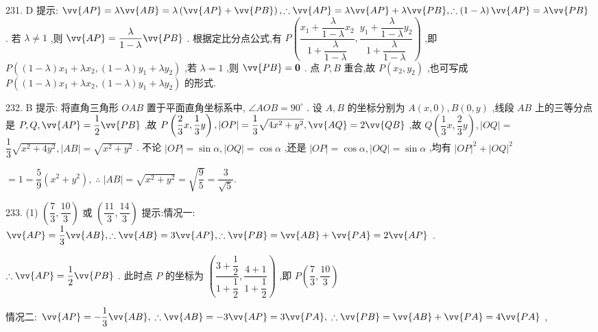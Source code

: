 231. D 提示: $\vv{AP} = \lambda \vv{AB} = \lambda \left( {\vv{AP} + \vv{PB}}\right) ,\therefore \vv{AP} = \lambda \vv{AP} + \lambda \vv{PB},\therefore \left( {1 - \lambda }\right) \vv{AP} = \lambda \vv{PB}$ . 若 $\lambda  \neq  1$ ,则 $\vv{AP} = \dfrac{\lambda }{1 - \lambda }\vv{PB}$ . 根据定比分点公式,有 $P\left( {\dfrac{{x}_{1} + \dfrac{\lambda }{1 - \lambda }{x}_{2}}{1 + \dfrac{\lambda }{1 - \lambda }},\dfrac{{y}_{1} + \dfrac{\lambda }{1 - \lambda }{y}_{2}}{1 + \dfrac{\lambda }{1 - \lambda }}}\right)$ ,即 $P\left( {\left( {1 - \lambda }\right) {x}_{1} + \lambda {x}_{2},\left( {1 - \lambda }\right) {y}_{1} + \lambda {y}_{2}}\right)$ ,若 $\lambda  = 1$ ,则 $\vv{PB} = \mathbf{0}$ . 点 $P,B$ 重合,故 $P\left( {{x}_{2},{y}_{2}}\right)$ ,也可写成 $P\left( {\left( {1 - \lambda }\right) {x}_{1} + \lambda {x}_{2},\left( {1 - \lambda }\right) {y}_{1} + \lambda {y}_{2}}\right)$ 的形式.

232. B 提示: 将直角三角形 ${OAB}$ 置于平面直角坐标系中, $\angle {AOB} = {90}^{ \circ  }$ . 设 $A,B$ 的坐标分别为 $A\left( {x,0}\right) ,B\left( {0,y}\right)$ ,线段 ${AB}$ 上的三等分点是 $P,Q,\vv{AP} = \dfrac{1}{2}\vv{PB}$ ,故 $P\left( {\dfrac{2}{3}x,\dfrac{1}{3}y}\right) ,\left| {OP}\right|  = \dfrac{1}{3}\sqrt{4{x}^{2} + {y}^{2}},\vv{AQ} = 2\vv{QB}$ ,故 $Q\left( {\dfrac{1}{3}x,\dfrac{2}{3}y}\right) ,\left| {OQ}\right|  =$  $\dfrac{1}{3}\sqrt{{x}^{2} + 4{y}^{2}},\left| {AB}\right|  = \sqrt{{x}^{2} + {y}^{2}}$ . 不论 $\left| {OP}\right|  = \sin \alpha ,\left| {OQ}\right|  = \cos \alpha$ ,还是 $\left| {OP}\right|  = \cos \alpha ,\left| {OQ}\right|  = \sin \alpha$ ,均有 ${\left| OP\right| }^{2} + {\left| OQ\right| }^{2}$

$= 1 = \dfrac{5}{9}\left( {{x}^{2} + {y}^{2}}\right) ,\;\therefore \;\left| {AB}\right|  = \sqrt{{x}^{2} + {y}^{2}} = \sqrt{\dfrac{9}{5}} = \dfrac{3}{\sqrt{5}}.$

233. (1) $\left( {\dfrac{7}{3},\dfrac{10}{3}}\right)$ 或 $\left( {\dfrac{11}{3},\dfrac{14}{3}}\right)$ 提示:情况一: $\vv{AP} = \dfrac{1}{3}\vv{AB},\therefore \vv{AB} = 3\vv{AP},\therefore \vv{PB} = \vv{AB} + \vv{PA} = 2\vv{AP}$ .

$\therefore \vv{AP} = \dfrac{1}{2}\vv{PB}$ . 此时点 $P$ 的坐标为 $\left( {\dfrac{3 + \dfrac{1}{2}}{1 + \dfrac{1}{2}},\dfrac{4 + 1}{1 + \dfrac{1}{2}}}\right)$ ,即 $P\left( {\dfrac{7}{3},\dfrac{10}{3}}\right)$

情况二: $\vv{AP} =  - \dfrac{1}{3}\vv{AB},\;\therefore \vv{AB} =  - 3\vv{AP} = 3\vv{PA},\;\therefore \vv{PB} = \vv{AB} + \vv{PA} = 4\vv{PA}$ ,

